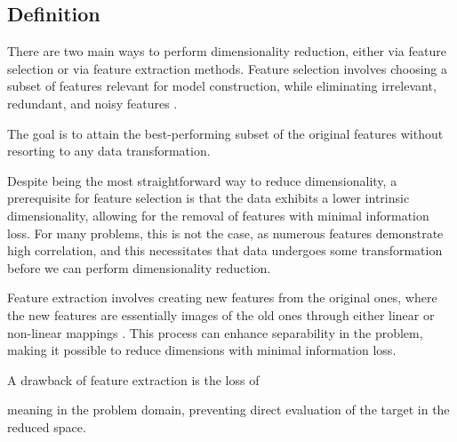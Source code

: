 \subsection{Definition}






    












        


















    





There are two main ways to perform dimensionality reduction, either via feature selection or via feature extraction methods. 
Feature selection involves choosing a subset of features relevant for model construction, while eliminating irrelevant, redundant, and noisy features \citep{TheBho24}.

The goal is to attain the best-performing subset of the original features without resorting to any data transformation.



Despite being the most straightforward way to reduce dimensionality,
a prerequisite for feature selection is that the data exhibits a lower intrinsic dimensionality, allowing for the removal of features with minimal information loss. 
For many problems, this is not the case, as numerous features demonstrate high correlation, and this necessitates that data undergoes some transformation before we can perform dimensionality reduction.

Feature extraction involves creating new features from the original ones, where the new features are essentially images of the old ones through either linear or non-linear mappings \citep{ElhEtAl24}. 
This process can enhance separability in the problem, making it possible to reduce dimensions with minimal information loss. 

A drawback of feature extraction is the loss of 

meaning in the problem domain, 
preventing direct evaluation of the target in the reduced space. 

